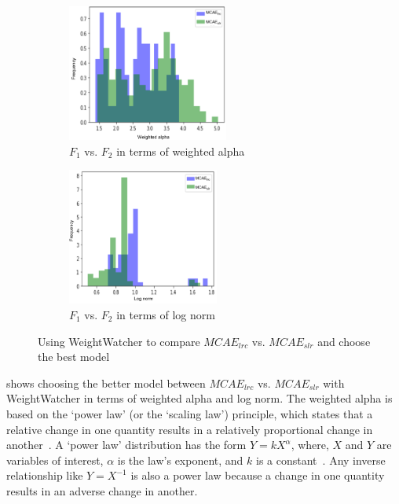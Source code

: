 \begin{figure}[h]
	\centering
	\begin{subfigure}{.48\linewidth}
		\centering
		\includegraphics[width=0.8\linewidth,height=45mm]{images/w1.png}
		\caption{$F_{1}$ vs. $F_{2}$ in terms of weighted alpha}
        \label{fig:ww1}
	\end{subfigure}
	\begin{subfigure}{0.48\linewidth}
		\centering
		\includegraphics[width=0.8\linewidth,height=45mm]{images/w2.png}
		\caption{$F_{1}$ vs. $F_{2}$ in terms of log norm}
        \label{fig:ww2}
	\end{subfigure}
	\caption[Using WeightWatcher to compare and choose the best models]{Using WeightWatcher to compare $MCAE_{lrc}$ vs. $MCAE_{slr}$ and choose the best model}
	\label{fig:weight_watch}
	\vspace{-2mm}
\end{figure}

\hspace*{3.5mm}  shows choosing the better model between $MCAE_{lrc}$ vs. $MCAE_{slr}$ with WeightWatcher in terms of weighted alpha and log norm. The weighted alpha is based on the `power law' (or the `scaling law') principle, which states that a relative change in one quantity results in a relatively proportional change in another~\cite{clauset2009power}. A `power law' distribution has the form $Y = kX^{\alpha}$, where, $X$ and $Y$ are variables of interest, $\alpha$ is the law's exponent, and $k$ is a constant~\cite{clauset2009power}. Any inverse relationship like $Y=X^{-1}$ is also a power law because a change in one quantity results in an adverse change in another.

